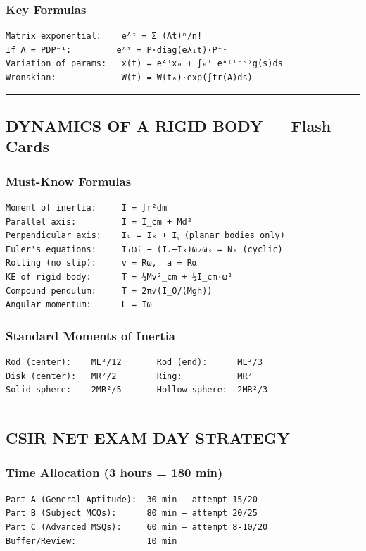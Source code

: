 \documentclass[12pt,a4paper,openany]{book}
\begin{document}
{{\subsubsection{Key Formulas}
\begin{verbatim}
Matrix exponential:    eᴬᵗ = Σ (At)ⁿ/n!
If A = PDP⁻¹:         eᴬᵗ = P·diag(eλᵢt)·P⁻¹
Variation of params:   x(t) = eᴬᵗx₀ + ∫₀ᵗ eᴬ⁽ᵗ⁻ˢ⁾g(s)ds
Wronskian:             W(t) = W(t₀)·exp(∫tr(A)ds)
\end{verbatim}

\bigskip\noindent\rule{\textwidth}{0.4pt}\bigskip

\subsection{ DYNAMICS OF A RIGID BODY — Flash Cards}

\subsubsection{Must-Know Formulas}
\begin{verbatim}
Moment of inertia:     I = ∫r²dm
Parallel axis:         I = I_cm + Md²
Perpendicular axis:    Iᵤ = Iₓ + Iᵧ (planar bodies only)
Euler's equations:     I₁ω̇₁ − (I₂−I₃)ω₂ω₃ = N₁ (cyclic)
Rolling (no slip):     v = Rω,  a = Rα
KE of rigid body:      T = ½Mv²_cm + ½I_cm·ω²
Compound pendulum:     T = 2π√(I_O/(Mgh))
Angular momentum:      L = Iω
\end{verbatim}

\subsubsection{Standard Moments of Inertia}
\begin{verbatim}
Rod (center):    ML²/12       Rod (end):      ML²/3
Disk (center):   MR²/2        Ring:           MR²
Solid sphere:    2MR²/5       Hollow sphere:  2MR²/3
\end{verbatim}

\bigskip\noindent\rule{\textwidth}{0.4pt}\bigskip

\subsection{ CSIR NET EXAM DAY STRATEGY}

\subsubsection{Time Allocation (3 hours = 180 min)}
\begin{verbatim}
Part A (General Aptitude):  30 min — attempt 15/20
Part B (Subject MCQs):      80 min — attempt 20/25
Part C (Advanced MSQs):     60 min — attempt 8-10/20
Buffer/Review:              10 min
\end{verbatim}

}}
\end{document}
